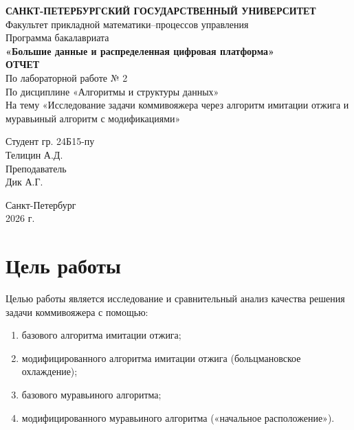 \documentclass[12pt,a4paper]{article}
\begin{document}
\begin{titlepage}
    \centering
    {\large \textbf{САНКТ-ПЕТЕРБУРГСКИЙ ГОСУДАРСТВЕННЫЙ УНИВЕРСИТЕТ}} \\[0.5cm]
    {\large Факультет прикладной математики--процессов управления} \\[0.5cm]
    {\large Программа бакалавриата} \\[0.2cm]
    {\large \textbf{«Большие данные и распределенная цифровая платформа»}} \\[4.5cm]

    {\Large \textbf{ОТЧЕТ}} \\[0.3cm]
    {\large По лабораторной работе № 2} \\[0.2cm]
    {\large По дисциплине «Алгоритмы и структуры данных»} \\[0.2cm]
    {\large На тему «Исследование задачи коммивояжера через алгоритм имитации отжига и муравьиный алгоритм с модификациями»} \\[4cm]

    \begin{flushright}
        Студент гр. 24Б15-пу \\
        Телицин А.Д. \\[0.5cm]
        Преподаватель \\
        Дик А.Г. \\[1cm]
    \end{flushright}

    \vfill
    \centering
    Санкт-Петербург \\
    2026 г.
\end{titlepage}

\tableofcontents
\newpage

\section{Цель работы}
\label{sec:goal}

Целью работы является исследование и сравнительный анализ качества решения задачи коммивояжера с помощью:
\begin{enumerate}
    \item базового алгоритма имитации отжига;
    \item модифицированного алгоритма имитации отжига (больцмановское охлаждение);
    \item базового муравьиного алгоритма;
    \item модифицированного муравьиного алгоритма («начальное расположение»).
\end{enumerate}
\end{document}
